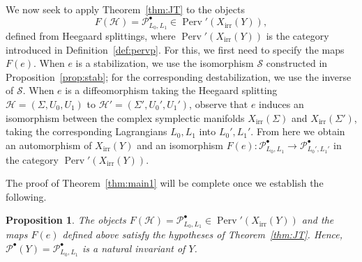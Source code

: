 \documentclass [11pt]{amsart}
\newtheorem {proposition}[theorem]{Proposition}
\theoremstyle{remark}
\def\Char {X}
\def\CharIrr {\Char_{\operatorname{irr}}}
\def\Stab{\mathscr{S}}
\def\Perv {\operatorname{Perv}}
\def\cH{\mathcal{H}}
\def\Pb {\mathcal{P}^\bullet}
\begin{document}
We now seek to apply Theorem~\ref{thm:JT} to the objects $$F(\cH)= \Pb_{L_0, L_1} \in \Perv'(\CharIrr(Y)),$$ defined from Heegaard splittings, where $\Perv'(\CharIrr(Y))$ is the category introduced in Definition~\ref{def:pervp}. For this, we first need to specify the maps $F(e)$. When $e$ is a stabilization, we use the isomorphism $\Stab$ constructed in Proposition~\ref{prop:stab}; for the corresponding destabilization, we use the inverse of $\Stab$. When $e$ is a diffeomorphism taking the Heegaard splitting $\cH=(\Sigma, U_0, U_1)$ to $\cH'=(\Sigma', U_0', U_1')$, observe that $e$ induces an isomorphism between the complex symplectic manifolds $\CharIrr(\Sigma)$ and $\CharIrr(\Sigma')$, taking the corresponding Lagrangians $L_0, L_1$ into $L_0', L_1'$. From here we obtain an automorphism of $\CharIrr(Y)$ and an isomorphism $F(e): \Pb_{L_0, L_1} \to \Pb_{L_0', L_1'}$ in the category $\Perv'(\CharIrr(Y))$.


The proof of Theorem~\ref{thm:main1} will be complete once we establish the following.

\begin{proposition}
The objects $F(\cH)= \Pb_{L_0, L_1} \in \Perv'(\CharIrr(Y))$ and the maps $F(e)$ defined above satisfy the hypotheses of Theorem~\ref{thm:JT}. Hence, $\Pb(Y) = \Pb_{L_0, L_1}$ is a natural invariant of $Y$.
\end{proposition}
\end{document}
